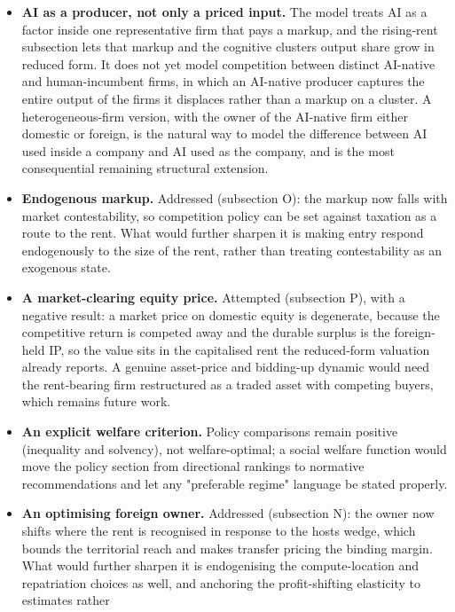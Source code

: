 \documentclass[12pt]{article}
\providecommand{\tightlist}{\setlength{\itemsep}{0pt}\setlength{\parskip}{0pt}}
\begin{document}
\begin{itemize}
\tightlist
\item
  \textbf{AI as a producer, not only a priced input.} The model treats
  AI as a factor inside one representative firm that pays a markup, and
  the rising-rent subsection lets that markup and the cognitive
  cluster\textquotesingle s output share grow in reduced form. It does
  not yet model competition between distinct AI-native and
  human-incumbent firms, in which an AI-native producer captures the
  entire output of the firms it displaces rather than a markup on a
  cluster. A heterogeneous-firm version, with the owner of the AI-native
  firm either domestic or foreign, is the natural way to model the
  difference between AI used inside a company and AI used as the
  company, and is the most consequential remaining structural extension.
\item
  \textbf{Endogenous markup.} Addressed (subsection O): the markup now
  falls with market contestability, so competition policy can be set
  against taxation as a route to the rent. What would further sharpen it
  is making entry respond endogenously to the size of the rent, rather
  than treating contestability as an exogenous state.
\item
  \textbf{A market-clearing equity price.} Attempted (subsection P),
  with a negative result: a market price on domestic equity is
  degenerate, because the competitive return is competed away and the
  durable surplus is the foreign-held IP, so the value sits in the
  capitalised rent the reduced-form valuation already reports. A genuine
  asset-price and bidding-up dynamic would need the rent-bearing firm
  restructured as a traded asset with competing buyers, which remains
  future work.
\item
  \textbf{An explicit welfare criterion.} Policy comparisons remain
  positive (inequality and solvency), not welfare-optimal; a social
  welfare function would move the policy section from directional
  rankings to normative recommendations and let any "preferable regime"
  language be stated properly.
\item
  \textbf{An optimising foreign owner.} Addressed (subsection N): the
  owner now shifts where the rent is recognised in response to the
  host\textquotesingle s wedge, which bounds the territorial reach and
  makes transfer pricing the binding margin. What would further sharpen
  it is endogenising the compute-location and repatriation choices as
  well, and anchoring the profit-shifting elasticity to estimates rather

\end{itemize}
\end{document}
